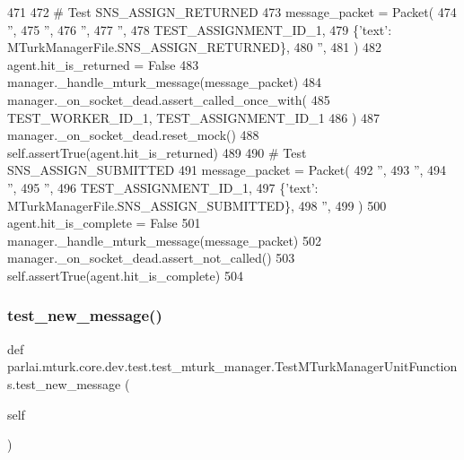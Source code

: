 \begin{DoxyCode}
471 
472         \textcolor{comment}{# Test SNS\_ASSIGN\_RETURNED}
473         message\_packet = Packet(
474             \textcolor{stringliteral}{''},
475             \textcolor{stringliteral}{''},
476             \textcolor{stringliteral}{''},
477             \textcolor{stringliteral}{''},
478             TEST\_ASSIGNMENT\_ID\_1,
479             \{\textcolor{stringliteral}{'text'}: MTurkManagerFile.SNS\_ASSIGN\_RETURNED\},
480             \textcolor{stringliteral}{''},
481         )
482         agent.hit\_is\_returned = \textcolor{keyword}{False}
483         manager.\_handle\_mturk\_message(message\_packet)
484         manager.\_on\_socket\_dead.assert\_called\_once\_with(
485             TEST\_WORKER\_ID\_1, TEST\_ASSIGNMENT\_ID\_1
486         )
487         manager.\_on\_socket\_dead.reset\_mock()
488         self.assertTrue(agent.hit\_is\_returned)
489 
490         \textcolor{comment}{# Test SNS\_ASSIGN\_SUBMITTED}
491         message\_packet = Packet(
492             \textcolor{stringliteral}{''},
493             \textcolor{stringliteral}{''},
494             \textcolor{stringliteral}{''},
495             \textcolor{stringliteral}{''},
496             TEST\_ASSIGNMENT\_ID\_1,
497             \{\textcolor{stringliteral}{'text'}: MTurkManagerFile.SNS\_ASSIGN\_SUBMITTED\},
498             \textcolor{stringliteral}{''},
499         )
500         agent.hit\_is\_complete = \textcolor{keyword}{False}
501         manager.\_handle\_mturk\_message(message\_packet)
502         manager.\_on\_socket\_dead.assert\_not\_called()
503         self.assertTrue(agent.hit\_is\_complete)
504 
\end{DoxyCode}
\mbox{\label{classparlai_1_1mturk_1_1core_1_1dev_1_1test_1_1test__mturk__manager_1_1TestMTurkManagerUnitFunctions_a82e736fd03c5f23710bba01e9335f6b8}} 
\subsubsection{\texorpdfstring{test\+\_\+new\+\_\+message()}{test\_new\_message()}}
{\footnotesize\ttfamily def parlai.\+mturk.\+core.\+dev.\+test.\+test\+\_\+mturk\+\_\+manager.\+Test\+M\+Turk\+Manager\+Unit\+Functions.\+test\+\_\+new\+\_\+message (\begin{DoxyParamCaption}\item[{}]{self }\end{DoxyParamCaption})}

